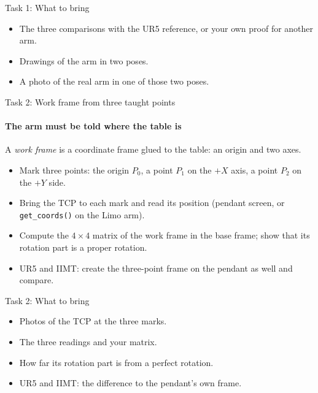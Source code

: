 \documentclass[aspectratio=169]{beamer}
\begin{document}
\begin{frame}[t]{Task 1: What to bring}
    \begin{itemize}
        \item The three comparisons with the UR5 reference, or your own proof for another arm.
        \item Drawings of the arm in two poses.
        \item A photo of the real arm in one of those two poses.
    \end{itemize}
\end{frame}

\begin{frame}[t]{Task 2: Work frame from three taught points}
\framesubtitle{The arm must be told where the table is}
    A \emph{work frame} is a coordinate frame glued to the table: an origin and two axes.
    \begin{itemize}
        \item Mark three points: the origin $P_0$, a point $P_1$ on the $+X$ axis, a point
              $P_2$ on the $+Y$ side.
        \item Bring the TCP to each mark and read its position (pendant screen, or
              \texttt{get\_coords()} on the Limo arm).
        \item Compute the $4\times4$ matrix of the work frame in the base frame; show that its
              rotation part is a proper rotation.
        \item UR5 and IIMT: create the three-point frame on the pendant as well and compare.
    \end{itemize}
\end{frame}

\begin{frame}[t]{Task 2: What to bring}
    \begin{itemize}
        \item Photos of the TCP at the three marks.
        \item The three readings and your matrix.
        \item How far its rotation part is from a perfect rotation.
        \item UR5 and IIMT: the difference to the pendant's own frame.
    \end{itemize}
\end{frame}
\end{document}
